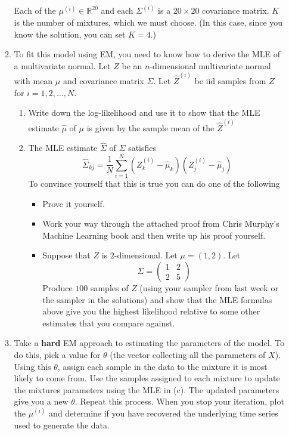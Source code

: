 \documentclass{article}
\begin{document}
\begin{enumerate}
\begin{enumerate}
Each of the $\mu^{(i)} \in \mathbb{R}^{20}$ and each $\Sigma^{(i)}$ is a $20 \times 20$ covariance matrix.  $K$ is the number of mixtures, which we must choose. (In this case, since you know the solution, you can set $K=4$.)
\item To fit this model using EM, you need to know how to derive the MLE of a multivariate normal.  Let $Z$ be an $n$-dimensional multivariate normal with mean $\mu$ and covariance matrix $\Sigma$.  Let $\hat{Z}^{(i)}$ be iid samples from $Z$ for $i=1,2,\dots,N$.   
\begin{enumerate}
\item Write down the log-likelihood and use it to show that  the MLE estimate $\hat{\mu}$ of $\mu$ is given by the sample mean of the $\hat{Z}^{(i)}$
\item The MLE estimate $\hat{\Sigma}$ of $\Sigma$ satisfies
\begin{equation}
\hat{\Sigma}_{kj} = \frac{1}{N}\sum_{i=1}^N (Z^{(i)}_k - \hat{\mu}_k)(Z^{(i)}_j - \hat{\mu}_j)
\end{equation}
To convince yourself that this is true you can do one of the following
\begin{itemize}
\item Prove it yourself.
\item Work your way through the attached proof from Chris Murphy's Machine Learning book and then write up his proof yourself.
\item Suppose that $Z$ is $2$-dimensional.  Let $\mu = (1,2)$.  Let
\begin{equation}
\Sigma = \left(
\begin{array}{cc}
1 & 2 \\
2 & 5
\end{array}
\right)
\end{equation}
Produce $100$ samples of $Z$ (using your sampler from last week or the sampler in the solutions) and show that the MLE formulas above give you the highest likelihood relative to some other estimates that you compare against.
\end{itemize}
\end{enumerate}
\item Take a \textbf{hard} EM approach to estimating the parameters of the model.  To do this, pick a value for $\theta$ (the vector collecting all the parameters of $X$).   Using this $\theta$, assign each sample in the data to the mixture it is most likely to come from.   Use the samples assigned to each mixture to update the mixtures parameters using the MLE in (c).   The updated parameters give you a new $\theta$.  Repeat this process.   When you stop your iteration, plot the $\mu^{(i)}$ and determine if you have recovered the underlying time series used to generate the data.  

\end{enumerate}
\end{enumerate}
\end{document}
